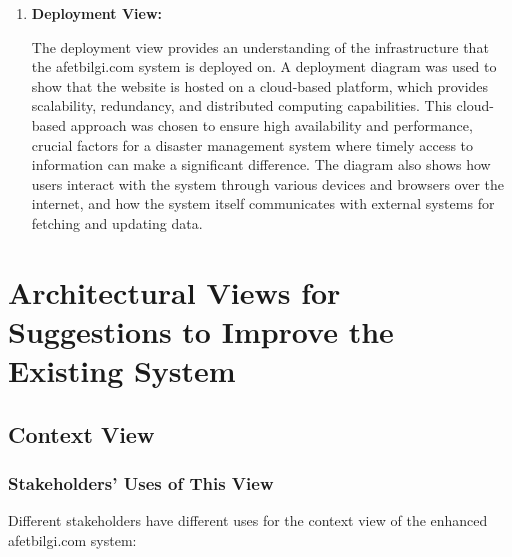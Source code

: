 \documentclass[12pt, letterpaper]{article}
\begin{document}
\begin{enumerate}
    \item \textbf{Deployment View:}

    The deployment view provides an understanding of the infrastructure that the afetbilgi.com system is deployed on. A deployment diagram was used to show that the website is hosted on a cloud-based platform, which provides scalability, redundancy, and distributed computing capabilities. This cloud-based approach was chosen to ensure high availability and performance, crucial factors for a disaster management system where timely access to information can make a significant difference. The diagram also shows how users interact with the system through various devices and browsers over the internet, and how the system itself communicates with external systems for fetching and updating data.
\end{enumerate}

\newpage

\section{Architectural Views for Suggestions to Improve the Existing System}

\subsection{Context View}
\subsubsection{Stakeholders' Uses of This View}
Different stakeholders have different uses for the context view of the enhanced afetbilgi.com system:
\end{document}
